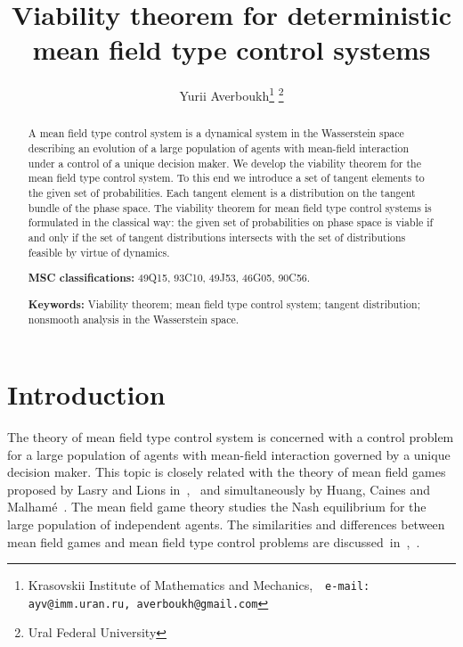 \documentclass[12pt]{article}
\title{Viability theorem for deterministic mean field type control systems}
\author{Yurii Averboukh\thanks{Krasovskii Institute of Mathematics and Mechanics,\ \ \texttt{e-mail: ayv@imm.uran.ru, averboukh@gmail.com}}{ }\thanks{
		Ural Federal University}}
\date{}
\begin{document}
\maketitle

\begin{abstract}
	A mean field type control system is 	a dynamical system in the Wasserstein space describing an evolution of a large population of agents with mean-field interaction under a control of a unique decision maker. 	
	We develop the viability theorem for the mean field type control system. To this end we introduce a set of tangent elements to the given set of probabilities. Each tangent element is a distribution on the  tangent bundle of the phase space. The viability theorem for mean field type control systems is formulated in the classical way: the given set of probabilities on phase space is viable if and only if the set of tangent distributions intersects with the set of distributions feasible by virtue of dynamics. 
	
	\noindent\textbf{MSC classifications:} 49Q15, 93C10, 49J53, 46G05, 90C56.
	
	\noindent\textbf{Keywords:} Viability theorem; mean field type control system; tangent distribution; nonsmooth analysis in the Wasserstein space.
\end{abstract}

\section{Introduction}\label{sec:intro}

The theory of mean field type control system is concerned with a control problem for a large population of agents with mean-field interaction governed by a  unique decision maker. This topic is closely related with the theory of mean field games  proposed by Lasry and Lions
in~\cite{Lions01},~\cite{Lions02} and simultaneously by Huang, Caines and Malham\'{e}~\cite{Huang5}.  The mean field game theory studies the Nash equilibrium for the large population of independent agents. The similarities and differences between mean field games and mean field type control problems are discussed~in~\cite{Bensoussan_Frehse_Yam_book},~\cite{Carmona_Delarue_Lachapelle_MFG_vs_MF_control}.
\end{document}
